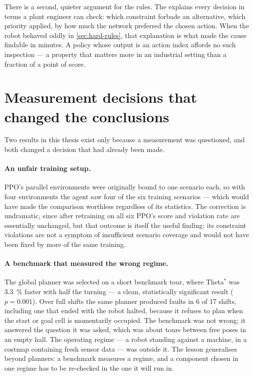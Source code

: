 There is a second, quieter argument for the rules. The \NS explains every decision in terms a
plant engineer can check: which constraint forbade an alternative, which priority applied, by how
much the network preferred the chosen action. When the robot behaved oddly in
\cref{sec:hard-rules}, that explanation is what made the cause findable in minutes. A policy whose
output is an action index affords no such inspection --- a property that matters more in an
industrial setting than a fraction of a point of score.

\section{Measurement decisions that changed the conclusions}
\label{sec:measurement}

Two results in this thesis exist only because a measurement was questioned, and both changed a
decision that had already been made.

\paragraph{An unfair training setup.}
PPO's parallel environments were originally bound to one scenario each, so with four environments
the agent saw four of the six training scenarios --- which would have made the comparison worthless
regardless of its statistics. The correction is undramatic, since after retraining on all six
PPO's score and violation rate are essentially unchanged, but that outcome is itself the useful
finding: its constraint violations are not a symptom of insufficient scenario coverage and would
not have been fixed by more of the same training.

\paragraph{A benchmark that measured the wrong regime.}
The global planner was selected on a short benchmark tour, where Theta$^{*}$ was \SI{3.3}{\percent}
faster with half the turning --- a clean, statistically significant result ($p=0.001$). Over full
shifts the same planner produced faults in \num{6} of \num{17} shifts, including one that ended
with the robot halted, because it refuses to plan when the start or goal cell is momentarily
occupied. The benchmark was not wrong; it answered the question it was asked, which was about
tours between free poses in an empty hall. The operating regime --- a robot standing against a
machine, in a costmap containing fresh sensor data --- was outside it. The lesson generalises
beyond planners: a benchmark measures a regime, and a component chosen in one regime has to be
re-checked in the one it will run in.

